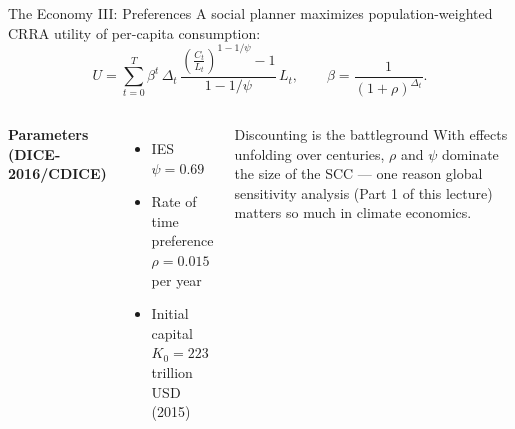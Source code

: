 \documentclass[aspectratio=169,11pt]{beamer}
\begin{document}
\begin{frame}{The Economy III: Preferences}
A social planner maximizes population-weighted CRRA utility of per-capita consumption:
\[
U = \sum_{t=0}^{T} \beta^{t}\, \Delta_t\,
\frac{\left(\frac{C_t}{L_t}\right)^{1-1/\psi} - 1}{1-1/\psi}\, L_t ,
\qquad
\beta = \frac{1}{(1+\rho)^{\Delta_t}} .
\]

\vspace{0.3cm}
\begin{columns}[T]
\textbf{Parameters (DICE-2016/CDICE)}
\begin{itemize}
    \item IES $\psi = 0.69$
    \item Rate of time preference $\rho = 0.015$ per year
    \item Initial capital $K_0 = 223$ trillion USD (2015)
\end{itemize}

\begin{block}{Discounting is the battleground}
With effects unfolding over centuries, $\rho$ and $\psi$ dominate the size of the SCC --- one reason global sensitivity analysis (Part 1 of this lecture) matters so much in climate economics.
\end{block}
\end{columns}
\end{frame}
\end{document}
